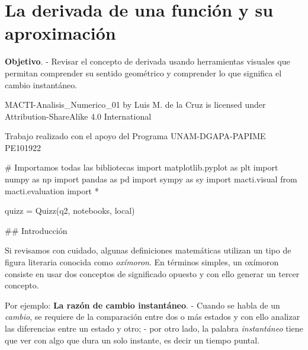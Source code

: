 \documentclass[
  letterpaper,
  DIV=11,
  numbers=noendperiod]{scrreprt}
\newenvironment{Shaded}{\begin{snugshade}}{\end{snugshade}}
\newcommand{\CommentTok}[1]{\textcolor[rgb]{0.37,0.37,0.37}{#1}}
\newcommand{\ImportTok}[1]{\textcolor[rgb]{0.00,0.46,0.62}{#1}}
\newcommand{\NormalTok}[1]{\textcolor[rgb]{0.00,0.23,0.31}{#1}}
\newcommand{\OperatorTok}[1]{\textcolor[rgb]{0.37,0.37,0.37}{#1}}
\newcommand{\StringTok}[1]{\textcolor[rgb]{0.13,0.47,0.30}{#1}}
\begin{document}

\chapter{La derivada de una función y su
aproximación}\label{la-derivada-de-una-funciuxf3n-y-su-aproximaciuxf3n}

\textbf{Objetivo}. - Revisar el concepto de derivada usando herramientas
visuales que permitan comprender su sentido geométrico y comprender lo
que significa el cambio instantáneo.

MACTI-Analisis\_Numerico\_01 by Luis M. de la Cruz is licensed under
Attribution-ShareAlike 4.0 International

Trabajo realizado con el apoyo del Programa UNAM-DGAPA-PAPIME PE101922

\begin{Shaded}
\begin{Highlighting}[]
\CommentTok{\# Importamos todas las bibliotecas}
\ImportTok{import}\NormalTok{ matplotlib.pyplot }\ImportTok{as}\NormalTok{ plt}
\ImportTok{import}\NormalTok{ numpy }\ImportTok{as}\NormalTok{ np}
\ImportTok{import}\NormalTok{ pandas }\ImportTok{as}\NormalTok{ pd}
\ImportTok{import}\NormalTok{ sympy }\ImportTok{as}\NormalTok{ sy}
\ImportTok{import}\NormalTok{ macti.visual}
\ImportTok{from}\NormalTok{ macti.evaluation }\ImportTok{import} \OperatorTok{*}
\end{Highlighting}
\end{Shaded}

\begin{Shaded}
\begin{Highlighting}[]
\NormalTok{quizz }\OperatorTok{=}\NormalTok{ Quizz(}\StringTok{\textquotesingle{}q2\textquotesingle{}}\NormalTok{, }\StringTok{\textquotesingle{}notebooks\textquotesingle{}}\NormalTok{, }\StringTok{\textquotesingle{}local\textquotesingle{}}\NormalTok{)}
\end{Highlighting}
\end{Shaded}

\#\# Introducción

Si revisamos con cuidado, algunas definiciones matemáticas utilizan un
tipo de figura literaria conocida como \emph{oxímoron}. En términos
simples, un oxímoron consiste en usar dos conceptos de significado
opuesto y con ello generar un tercer concepto.

Por ejemplo: \textbf{La razón de cambio instantáneo}. - Cuando se habla
de un \emph{cambio}, se requiere de la comparación entre dos o más
estados y con ello analizar las diferencias entre un estado y otro; -
por otro lado, la palabra \emph{instantáneo} tiene que ver con algo que
dura un solo instante, es decir un tiempo puntal.
\end{document}

